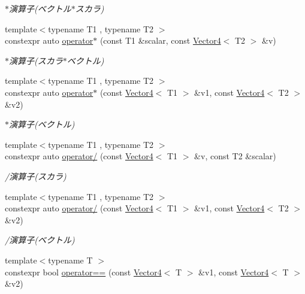 \begin{DoxyCompactItemize}
\begin{DoxyCompactList}\small\item\em $\ast$演算子(ベクトル$\ast$スカラ) \end{DoxyCompactList}\item 
{\footnotesize template$<$typename T1 , typename T2 $>$ }\\constexpr auto \mbox{\hyperlink{namespacesaki_adb31a759973c1c3d861bcaa5375f58bd}{operator$\ast$}} (const T1 \&scalar, const \mbox{\hyperlink{classsaki_1_1_vector4}{Vector4}}$<$ T2 $>$ \&v)
\begin{DoxyCompactList}\small\item\em $\ast$演算子(スカラ$\ast$ベクトル) \end{DoxyCompactList}\item 
{\footnotesize template$<$typename T1 , typename T2 $>$ }\\constexpr auto \mbox{\hyperlink{namespacesaki_a7bddc36f87a91453fa188323d7bbdaee}{operator$\ast$}} (const \mbox{\hyperlink{classsaki_1_1_vector4}{Vector4}}$<$ T1 $>$ \&v1, const \mbox{\hyperlink{classsaki_1_1_vector4}{Vector4}}$<$ T2 $>$ \&v2)
\begin{DoxyCompactList}\small\item\em $\ast$演算子(ベクトル) \end{DoxyCompactList}\item 
{\footnotesize template$<$typename T1 , typename T2 $>$ }\\constexpr auto \mbox{\hyperlink{namespacesaki_a5170a233051df50d389f8f3453fc0fc2}{operator/}} (const \mbox{\hyperlink{classsaki_1_1_vector4}{Vector4}}$<$ T1 $>$ \&v, const T2 \&scalar)
\begin{DoxyCompactList}\small\item\em /演算子(スカラ) \end{DoxyCompactList}\item 
{\footnotesize template$<$typename T1 , typename T2 $>$ }\\constexpr auto \mbox{\hyperlink{namespacesaki_a32509cf81fad65763330008503395613}{operator/}} (const \mbox{\hyperlink{classsaki_1_1_vector4}{Vector4}}$<$ T1 $>$ \&v1, const \mbox{\hyperlink{classsaki_1_1_vector4}{Vector4}}$<$ T2 $>$ \&v2)
\begin{DoxyCompactList}\small\item\em /演算子(ベクトル) \end{DoxyCompactList}\item 
{\footnotesize template$<$typename T $>$ }\\constexpr bool \mbox{\hyperlink{namespacesaki_ab4626967b917017c2acf6ad76789db6c}{operator==}} (const \mbox{\hyperlink{classsaki_1_1_vector4}{Vector4}}$<$ T $>$ \&v1, const \mbox{\hyperlink{classsaki_1_1_vector4}{Vector4}}$<$ T $>$ \&v2)

\end{DoxyCompactItemize}
